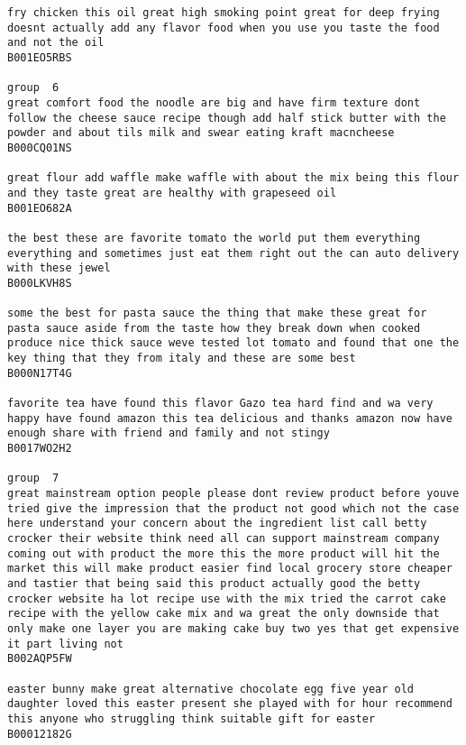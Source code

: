 \documentclass[11pt]{article}
\begin{document}
\begin{Verbatim}[commandchars=\\\{\}]
fry chicken this oil great high smoking point great for deep frying doesnt actually add any flavor food when you use you taste the food and not the oil
B001EO5RBS

group  6
great comfort food the noodle are big and have firm texture dont follow the cheese sauce recipe though add half stick butter with the powder and about tils milk and swear eating kraft macncheese
B000CQ01NS

great flour add waffle make waffle with about the mix being this flour and they taste great are healthy with grapeseed oil
B001EO682A

the best these are favorite tomato the world put them everything everything and sometimes just eat them right out the can auto delivery with these jewel
B000LKVH8S

some the best for pasta sauce the thing that make these great for pasta sauce aside from the taste how they break down when cooked produce nice thick sauce weve tested lot tomato and found that one the key thing that they from italy and these are some best
B000N17T4G

favorite tea have found this flavor Gazo tea hard find and wa very happy have found amazon this tea delicious and thanks amazon now have enough share with friend and family and not stingy
B0017WO2H2

group  7
great mainstream option people please dont review product before youve tried give the impression that the product not good which not the case here understand your concern about the ingredient list call betty crocker their website think need all can support mainstream company coming out with product the more this the more product will hit the market this will make product easier find local grocery store cheaper and tastier that being said this product actually good the betty crocker website ha lot recipe use with the mix tried the carrot cake recipe with the yellow cake mix and wa great the only downside that only make one layer you are making cake buy two yes that get expensive it part living not
B002AQP5FW

easter bunny make great alternative chocolate egg five year old daughter loved this easter present she played with for hour recommend this anyone who struggling think suitable gift for easter
B00012182G


\end{Verbatim}
\end{document}
